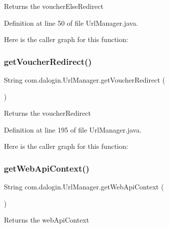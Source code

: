 \begin{DoxyReturn}{Returns}
the voucher\+Else\+Redirect 
\end{DoxyReturn}


Definition at line 50 of file Url\+Manager.\+java.

Here is the caller graph for this function\+:
\mbox{\label{classcom_1_1dalogin_1_1_url_manager_ae70ac1b1bff4fe04fdfabb1f8957bdf7}} 
\subsubsection{\texorpdfstring{get\+Voucher\+Redirect()}{getVoucherRedirect()}}
{\footnotesize\ttfamily String com.\+dalogin.\+Url\+Manager.\+get\+Voucher\+Redirect (\begin{DoxyParamCaption}{ }\end{DoxyParamCaption})}

\begin{DoxyReturn}{Returns}
the voucher\+Redirect 
\end{DoxyReturn}


Definition at line 195 of file Url\+Manager.\+java.

Here is the caller graph for this function\+:
\mbox{\label{classcom_1_1dalogin_1_1_url_manager_ab6013bcf6b39e4372eab0111622d8fa1}} 
\subsubsection{\texorpdfstring{get\+Web\+Api\+Context()}{getWebApiContext()}}
{\footnotesize\ttfamily String com.\+dalogin.\+Url\+Manager.\+get\+Web\+Api\+Context (\begin{DoxyParamCaption}{ }\end{DoxyParamCaption})}

\begin{DoxyReturn}{Returns}
the web\+Api\+Context 
\end{DoxyReturn}


